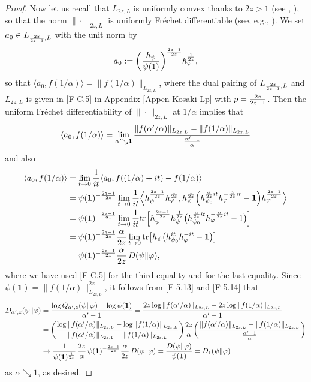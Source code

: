 \documentclass[12pt]{article}
\theoremstyle{definition}
\theoremstyle{remark}
\numberwithin{equation}{section}
\def\Tr{\mathrm{tr}}
\def\<{\langle}
\def\>{\rangle}
\def\ffi{\varphi}
\def\1{\mathbf{1}}
\begin{document}
\begin{proof}
Now let us recall that $L_{2z,L}$ is uniformly convex thanks to $2z>1$ (see \cite{haagerup1979lpspaces},
\cite[Theorem 4.2]{kosaki1984applications}), so that the norm $\|\cdot\|_{2z,L}$ is uniformly Fr\'echet
differentiable (see, e.g., \cite[Part 3, Chap.~II]{beauzamy1982introduction}). {\color{red}We set
$a_0\in L_{{2z\over2z-1},L}$ with the unit norm by
\[
a_0:=\biggl({h_\psi\over\psi(1)}\biggr)^{2z-1\over2z}h_\ffi^{1\over2z},
\]
so that $\<a_0,f(1/\alpha)\>=\|f(1/\alpha)\|_{L_{2z,L}}$, where the dual pairing of $L_{{2z\over2z-1},L}$
and $L_{2z,L}$ is given in \eqref{F-C.5} in Appendix \ref{Appen-Kosaki-Lp} with $p={2z\over2z-1}$.} Then
the uniform Fr\'echet differentiability of $\|\cdot\|_{2z,L}$ at $1/\alpha$ implies that
\begin{align}\label{F-5.13}
\<a_0,f(1/\alpha)\>
=\lim_{\alpha'\searrow\1}{\|f(\alpha'/\alpha)\|_{L_{2z,L}}-\|f(1/\alpha)\|_{L_{2z,L}}
\over{\alpha'-1\over\alpha}}
\end{align}
and also
\begin{align}
\<a_0,f(1/\alpha)\>
&=\lim_{t\to0}{1\over it}\<a_0,f((1/\alpha)+it)-f(1/\alpha)\> \nonumber\\
&=\psi(\1)^{-{2z-1\over2z}}\lim_{t\to0}{1\over it}\Bigl\<h_\psi^{2z-1\over2z}h_\ffi^{1\over2z},
h_\psi^{1\over2z}\Bigl(h_{\psi_0}^{{\alpha\over2z}it}h_\ffi^{-{\alpha\over2z}it}-\1\Bigr)
h_\ffi^{2z-1\over2z}\Bigr\> \nonumber\\
&=\psi(\1)^{-{2z-1\over2z}}\lim_{t\to0}{1\over it}\Tr\Bigl[h_\psi^{2z-1\over2z}h_\psi^{1\over2z}
\bigl(h_{\psi_0}^{{\alpha\over2z}it}h_\ffi^{-{\alpha\over2z}it}-1\bigr)\Bigr] \nonumber\\
&=\psi(\1)^{-{2z-1\over2z}}{\alpha\over2z}
\lim_{t\to0}\Tr\bigl[h_\psi\bigl(h_{\psi_0}^{it}h_\ffi^{-it}-\1\bigr)\bigr] \nonumber\\
&=\psi(\1)^{-{2z-1\over2z}}{\alpha\over2z}\,D(\psi\|\ffi), \label{F-5.14}
\end{align}
where we have used {\color{red}\eqref{F-C.5} for the third equality and} \cite[Theorem 5.7]{ohya1993quantum}
for the last equality. Since $\psi(\1)=\|f(1/\alpha)\|_{L_{2z,L}}^{2z}$, it follows from \eqref{F-5.13} and
\eqref{F-5.14} that
\begin{align*}
D_{\alpha',z}(\psi\|\ffi)
&={\log Q_{\alpha',z}(\psi\|\ffi)-\log\psi(\1)\over\alpha'-1}
={2z\log\|f(\alpha'/\alpha)\|_{L_{2z,L}}-2z\log\|f(1/\alpha)\|_{L_{2z,L}}\over\alpha'-1} \\
&=\biggl({\log\|f(\alpha'/\alpha)\|_{L_{2z,L}}-\log\|f(1/\alpha)\|_{L_{2z,L}}\over
\|f(\alpha'/\alpha)\|_{L_{2z,L}}-\|f(1/\alpha)\|_{L_{2z,L}}}\biggr)
{2z\over\alpha}\biggl({\|f(\alpha'/\alpha)\|_{L_{2z,L}}-\|f(1/\alpha)\|_{L_{2z,L}}\over
{\alpha'-1\over\alpha}}\biggr) \\
&\to{1\over\psi(\1)^{1\over2z}}\,{2z\over\alpha}\,\psi(\1)^{-{2z-1\over2z}}{\alpha\over2z}\,D(\psi\|\ffi)
={D(\psi\|\ffi)\over\psi(\1)}=D_1(\psi\|\ffi)
\end{align*}
as $\alpha\searrow1$, as desired.
\end{proof}
\end{document}
